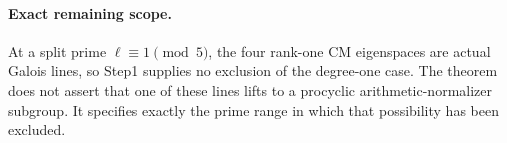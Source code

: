\paragraph{Exact remaining scope.}
At a split prime $\ell\equiv1\pmod5$, the four rank-one
CM eigenspaces are actual Galois lines, so Step1 supplies
no exclusion of the degree-one case. The theorem does not
assert that one of these lines lifts to a procyclic
arithmetic-normalizer subgroup. It specifies exactly the
prime range in which that possibility has been excluded.
